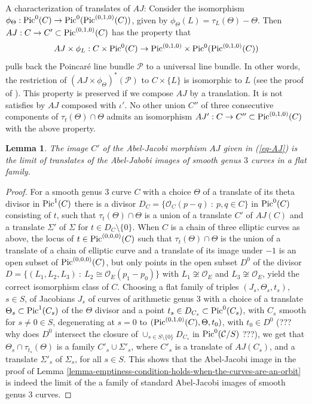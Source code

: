 \documentclass[12pt]{amsart}
\numberwithin{equation}{subsection}
\theoremstyle{plain}
\newtheorem{lem}[thm]{Lemma}
\theoremstyle{definition}
\newcommand{\C}{{\mathcal C}}
\renewcommand{\P}{{\mathcal P}}
\newcommand{\StructureSheaf}[1]{{\mathcal O}_{#1}}
\newcommand{\Pic}{{\rm Pic}}
\begin{document}
{A characterization of translates of $AJ$: 
Consider the isomorphism $\phi_\Theta:\Pic^0(C)\rightarrow \Pic^0(\Pic^{(0,1,0)}(C))$, given by $\phi_\Theta(L)=\tau_L(\Theta)-\Theta$.
Then 
$AJ:C\rightarrow C'\subset \Pic^{(0,1,0)}(C)$ has the property that 
\[
AJ\times\phi_L:C\times\Pic^0(C)\rightarrow \Pic^{(0,1,0)}\times \Pic^0(\Pic^{(0,1,0)}(C))
\]
pulls back the Poincar\'{e} line bundle $\P$ to a universal line bundle. In other words, the restriction of $(AJ\times\phi_\Theta)^*(\P)$ to $C\times\{L\}$
is isomorphic to $L$ (see the proof of \cite[Prop. 11.3.2]{BL}). 
This property is preserved if we compose $AJ$ by a translation. It is not satisfies by  $AJ$ composed with $\iota'$.
No other union $C''$ of three consecutive components of $\tau_t(\Theta)\cap \Theta$
admits an isomorphism $AJ':C\rightarrow C''\subset \Pic^{(0,1,0)}(C)$ with the above property.

\begin{lem}
\label{lemma-C-prime-is-the-limit-of-translates-of-AJ-images}
The image $C'$ of the Abel-Jacobi morphism $AJ$ given in (\ref{eq-AJ}) is the limit of translates of the Abel-Jabobi images of smooth genus $3$ curves in a flat family.
\end{lem}

\begin{proof}
For a smooth genus $3$ curve $C$ with a choice $\Theta$ of a translate of its theta divisor in $\Pic^1(C)$ there is a divisor $D_C=\{\StructureSheaf{C}(p-q) \ : \ p,q\in C\}$ in $\Pic^0(C)$ consisting of $t$, such that $\tau_t(\Theta)\cap \Theta$ is a union of a translate $C'$ of $AJ(C)$ and a translate $\Sigma'$ of $\Sigma$ for $t\in D_C\setminus\{0\}$. 
When $C$ is a chain of three elliptic curves as above, the locus of $t\in\Pic^{(0,0,0)}(C)$ such that 
$\tau_t(\Theta)\cap\Theta$ is the union of a translate of a chain of elliptic curve and a translate of its image under $-1$ is an open subset of $\Pic^{(0,0,0)}(C)$,
but only points in the open subset $D^0$ of the divisor $D=\{(L_1,L_2,L_3) \ : \ L_2\cong \StructureSheaf{E}(p_1-p_0)\}$ with $L_1\not\cong\StructureSheaf{E}$ and $L_3\not\cong\StructureSheaf{E}$, yield the correct isomorphism class of $C$.
Choosing a flat family of triples $(J_s,\Theta_s,t_s)$, $s\in S$, of Jacobians $J_s$ of curves of arithmetic genus $3$ with a choice of a translate $\Theta_s\subset \Pic^1(C_s)$ of the $\Theta$ divisor  and a point $t_s\in D_{C_s}\subset \Pic^0(C_s)$, with $C_s$ smooth for $s\neq 0\in S$, degenerating at $s=0$ to $(\Pic^{(0,1,0)}(C),\Theta,t_0)$, with $t_0\in D^0$ (??? why does $D^0$ intersect the closure of $\cup_{s\in S\setminus\{0\}}D_{C_s}$ in $\Pic^0(\C/S)$ ???), 
we get that $\Theta_s\cap\tau_{t_s}(\Theta)$ is a family $C'_s\cup\Sigma'_s$,
where $C'_s$ is a translate of $AJ(C_s)$, and a translate $\Sigma'_s$ of $\Sigma_s$, for all $s\in S$. This shows that the Abel-Jacobi image in the proof of Lemma \ref{lemma-emptiness-condition-holds-when-the-curves-are-an-orbit} is indeed the limit of the a family of standard Abel-Jacobi images of smooth genus $3$ curves.
\end{proof}

}
\end{document}
